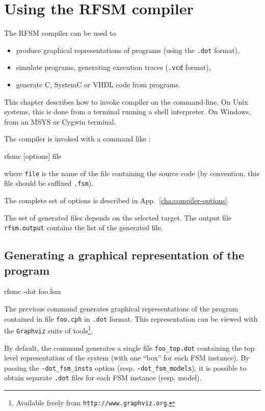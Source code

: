 \chapter{Using the RFSM compiler}
\label{cha:rfsmc}

The RFSM compiler can be used to
\begin{itemize}
\item produce graphical representations of programs (using the \verb|.dot| format),
\item simulate programs, generating execution traces (\verb|.vcd| format),
\item generate C, SystemC or VHDL code from programs.
\end{itemize}

This chapter describes how to invoke compiler on the command-line. On Unix systems, this is
done from a terminal running a shell interpreter. On Windows, from an MSYS or Cygwin
terminal.

\medskip
The compiler is invoked with a command like :

\begin{FVerbatim}
rfsmc [options] file
\end{FVerbatim}

where \texttt{file} is the name of the file containing the source code (by convention, this file
should be suffixed \texttt{.fsm}). 

The complete set of options is described in App.~\ref{cha:compiler-options}.

The set of generated files depends on the selected target. The output file \texttt{rfsm.output}
contains the list of the generated file.

\section{Generating a graphical representation of the program}
\label{sec:gener-graph-repr}

\begin{FVerbatim}
rfsmc -dot foo.fsm  
\end{FVerbatim}

The previous command generates graphical representations of the program contained in file
\texttt{foo.cph} in \verb|.dot| format.  This representation can be viewed with the
\texttt{Graphviz} suite of tools\footnote{Available freely from \texttt{http://www.graphviz.org}.}.

By default, the command generates a single file
\verb|foo_top.dot| containing the top level representation of the system (with one
  ``box'' for each FSM instance). By passing the \verb|-dot_fsm_insts| option
  (resp. \verb|-dot_fsm_models|), it is possible to obtain separate \verb|.dot| files for each FSM
  instance (resp. model).

